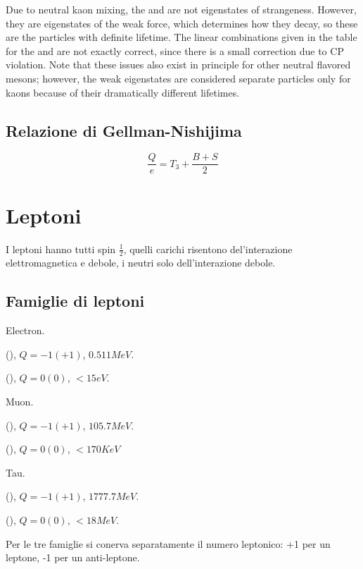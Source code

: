\documentclass[main.tex]{subfiles}
\begin{document}
Due to neutral kaon mixing, the \PKzS and \PKzL are not eigenstates of strangeness. However, they are eigenstates of the weak force, which determines how they decay, so these are the particles with definite lifetime. The linear combinations given in the table for the \PKzS and \PKzL are not exactly correct, since there is a small correction due to CP violation. Note that these issues also exist in principle for other neutral flavored mesons; however, the weak eigenstates are considered separate particles only for kaons because of their dramatically different lifetimes.

\subsection{Relazione di Gellman-Nishijima} \begin{equation*}\frac{Q}{e}=T_3+\frac{B+S}{2}
\end{equation*}

\section{Leptoni}

I leptoni hanno tutti spin $\frac{1}{2}$, quelli carichi risentono del'interazione elettromagnetica e debole, i neutri solo dell'interazione debole.

\subsection{Famiglie di leptoni}
\begin{itemize*}
\item Electron.

\Pelectron(\APelectron), $Q=-1(+1)$, $0.511 MeV$.

\Pnue(\APnue), $Q=0(0)$, $<15eV$.

\item Muon.

\Pmuon(\APmuon), $Q=-1(+1)$, $105.7 MeV$.

\Pnum(\APnum), $Q=0(0)$, $<170 KeV$

\item Tau.

\Ptauon(\APtauon), $Q=-1(+1)$, $1777.7 MeV$.

\Pnue(\APnue), $Q=0(0)$, $<18 MeV$.

\end{itemize*}

Per le tre famiglie si conerva separatamente il numero leptonico: +1 per un leptone, -1 per un anti-leptone.
\end{document}
